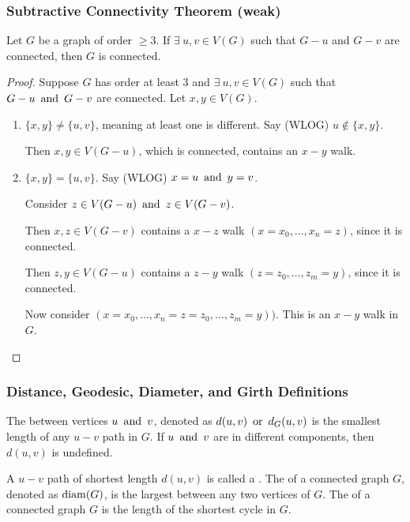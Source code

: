 \subsubsection*{Subtractive Connectivity Theorem (weak)}
Let $G$ be a graph of order $\geq 3$. If $\exists~ u,v \in V(G)$ such that $G-u$ and $G-v$ are connected, then $G$ is connected.
\begin{proof}
    Suppose $G$ has order at least 3 and $\exists~ u,v \in V(G)$ such that $G-u \operatorname{~\text{and}~} G-v$ are connected. Let $x,y \in V(G)$.
    \begin{enumerate}[start=1,label={\bfseries Case \arabic*:},leftmargin=0.75in]
        \item $\{x,y\} \neq \{u,v\}$, meaning at least one is different. Say (WLOG) $u \notin \{x,y\}$.

              Then $x,y \in V(G-u)$, which is connected, contains an $x-y$ walk.
        \item $\{x,y\} = \{u,v\}$. Say (WLOG) $x=u \operatorname{~\text{and}~} y=v$.

              Consider $z \in V(G-u) \operatorname{~\text{and}~} z \in V(G-v)$.

              Then $x,z \in V(G-v)$ contains a $x-z$ walk $(x=x_0, \ldots, x_n = z)$, since it is connected.

              Then $z,y \in V(G-u)$ contains a $z-y$ walk $(z=z_0, \ldots, z_m = y)$, since it is connected.

              Now consider $(x=x_0, \ldots, x_n = z = z_0, \ldots, z_m = y))$. This is an $x-y$ walk in $G$.
    \end{enumerate}
\end{proof}

\subsubsection*{Distance, Geodesic, Diameter, and Girth Definitions}
The  between vertices $u \operatorname{~\text{and}~} v$, denoted as $d(u,v) \operatorname{~\text{or}~} d_G(u,v)$ is the smallest length of any $u-v$ path in $G$. If $u \operatorname{~\text{and}~} v$ are in different components, then $d(u,v)$ is undefined.

A $u-v$ path of shortest length $d(u,v)$ is called a . The  of a connected graph $G$, denoted as $\operatorname{\text{diam}}(G)$, is the largest  between any two vertices of $G$. The  of a connected graph $G$ is the length of the shortest cycle in $G$.

